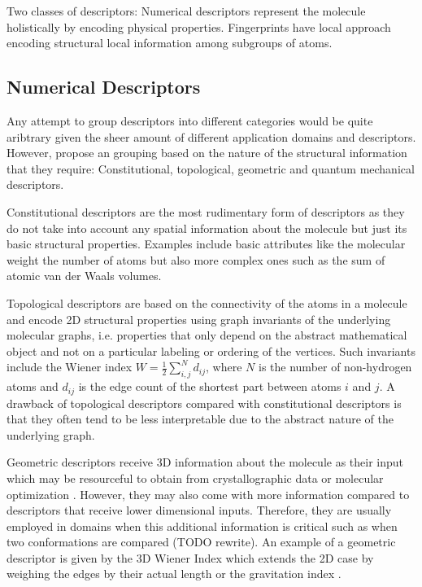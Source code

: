Two classes of descriptors: Numerical descriptors represent the molecule holistically by encoding physical properties. Fingerprints have local approach encoding structural local information among subgroups of atoms.
\subsection{Numerical Descriptors}

Any attempt to group descriptors into different categories would be quite aribtrary given the sheer amount of different application domains and descriptors. However, \cite{descript} propose an grouping based on the nature of the structural information that they require: Constitutional, topological, geometric and quantum mechanical descriptors. 

Constitutional descriptors are the most rudimentary form of descriptors as they do not take into account any spatial information about the molecule but just its basic structural properties. Examples include basic attributes like the molecular weight the number of atoms but also more complex ones such as the sum of atomic van der Waals volumes. 

Topological descriptors are based on the connectivity of the atoms in a molecule and encode 2D structural properties using graph invariants of the underlying molecular graphs, i.e. properties that only depend on the abstract mathematical object and not on a particular labeling or ordering of the vertices. Such invariants include the Wiener index \cite{wiener1947structural, nikolic2001wiener} $W = \frac{1}{2} \sum_{i,j}^ N d_{ij}$, where $N$ is the number of non-hydrogen atoms and $d_{ij}$ is the edge count of the shortest part between atoms $i$ and $j$. A drawback of topological descriptors compared with constitutional descriptors is that they often tend to be less interpretable due to the abstract nature of the underlying graph. 

Geometric descriptors receive 3D information about the molecule as their input which may be resourceful to obtain from crystallographic data or molecular optimization \cite{Mauri2016}. However, they may also come with more information compared to descriptors that receive lower dimensional inputs. Therefore, they are usually employed in domains when this additional information is critical such as when two conformations are compared (TODO rewrite). An example of a geometric descriptor is given by the 3D Wiener Index which extends the 2D case by weighing the edges by their actual length or the gravitation index \cite{katritzky1996correlation}.

